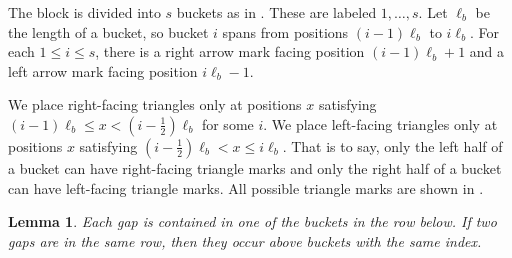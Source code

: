 \documentclass[11pt]{article}
\theoremstyle{plain}
\newtheorem{lemma}[theorem]{Lemma}
\theoremstyle{definition}
\begin{document}
The block is divided into $s$ buckets as in . These are labeled $1, \dots, s$. Let $\ell_b$ be the length of a bucket, so bucket $i$ spans from positions $(i-1)\ell_b$ to $i\ell_b$. For each $1\le i\le s$, there is a right arrow mark facing position $(i-1)\ell_b+1$ and a left arrow mark facing position $i\ell_b-1$. 

We place right-facing triangles only at positions $x$ satisfying $(i-1)\ell_b\le x < (i-\frac12)\ell_b$ for some $i$. We place left-facing triangles only at positions $x$ satisfying $(i-\frac12)\ell_b< x\le i\ell_b$. That is to say, only the left half of a bucket can have right-facing triangle marks and only the right half of a bucket can have left-facing triangle marks. All possible triangle marks are shown in .

\begin{lemma}\label{lem:gapsinsamebucket}
Each gap is contained in one of the buckets in the row below. If two gaps are in the same row, then they occur above buckets with the same index.
\end{lemma}
\end{document}
